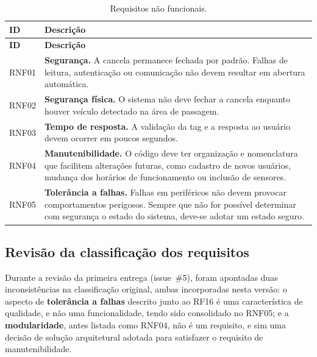 \documentclass[11pt,a4paper]{article}
\begin{document}
\begin{longtable}{@{}p{1.5cm}L{12.6cm}@{}}
\caption{Requisitos não funcionais.}\label{tab:rnf}\\
\toprule
\textbf{ID} & \textbf{Descrição} \\
\midrule
\endfirsthead
\toprule
\textbf{ID} & \textbf{Descrição} \\
\midrule
\endhead
\bottomrule
\endfoot

RNF01 & \textbf{Segurança.} A cancela permanece fechada por padrão. Falhas de
leitura, autenticação ou comunicação não devem resultar em abertura automática. \\[4pt]

RNF02 & \textbf{Segurança física.} O sistema não deve fechar a cancela enquanto
houver veículo detectado na área de passagem. \\[4pt]

RNF03 & \textbf{Tempo de resposta.} A validação da tag e a resposta ao usuário
devem ocorrer em poucos segundos. \\[4pt]

RNF04 & \textbf{Manutenibilidade.} O código deve ter organização e nomenclatura
que facilitem alterações futuras, como cadastro de novos usuários, mudança dos
horários de funcionamento ou inclusão de sensores. \\[4pt]

RNF05 & \textbf{Tolerância a falhas.} Falhas em periféricos não devem provocar
comportamentos perigosos. Sempre que não for possível determinar com segurança o
estado do sistema, deve-se adotar um estado seguro. \\
\end{longtable}

\subsection{Revisão da classificação dos requisitos}

Durante a revisão da primeira entrega (issue~\#5), foram apontadas duas
inconsistências na classificação original, ambas incorporadas nesta versão: o
aspecto de \textbf{tolerância a falhas} descrito junto ao RF16 é uma
característica de qualidade, e não uma funcionalidade, tendo sido consolidado no
RNF05; e a \textbf{modularidade}, antes listada como RNF04, não é um requisito,
e sim uma decisão de solução arquitetural adotada para satisfazer o requisito de
manutenibilidade.

\end{document}
